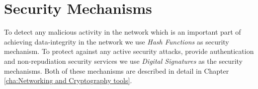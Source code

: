 



\section{Security Mechanisms}
	To detect any malicious activity in the network which is an important part of achieving data-integrity in the network we use \textit{Hash Functions} as security mechanism.
	To protect against any active security attacks, provide authentication and non-repudiation security services we use \textit{Digital Signatures} as the security mechanisms.
	Both of these mechanisms are described in detail in Chapter \ref{cha:Networking and Cryptography tools}.	